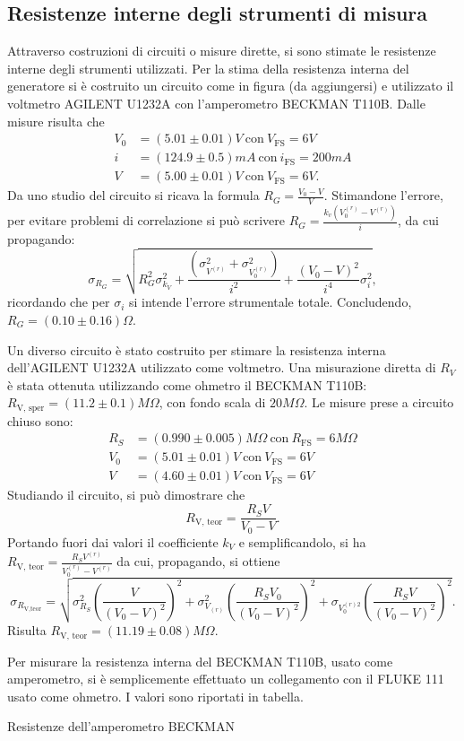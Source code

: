 \subsection{Resistenze interne degli strumenti di misura}
Attraverso costruzioni di circuiti o misure dirette, si sono stimate le resistenze interne degli strumenti utilizzati.
Per la stima della resistenza interna del generatore si \`e costruito un circuito come in figura (da aggiungersi) e utilizzato il voltmetro AGILENT U1232A con l'amperometro BECKMAN T110B.
Dalle misure risulta che
\begin{align}
V_0 &=(5.01 \pm 0.01 )V \ \textrm{con}\  V_{\textrm{FS}}=6V \\
i   &=(124.9 \pm 0.5) mA \ \textrm{con}\  i_{\textrm{FS}}=200mA \\
V   &=(5.00 \pm 0.01) V \ \textrm{con}\  V_{\textrm{FS}}=6V.
\end{align}
Da uno studio del circuito si ricava la formula $R_G=\frac{V_0-V}{V}$.
Stimandone l'errore, per evitare problemi di correlazione si pu\`o scrivere $R_G=\frac{k_v (V_0^{(r)}- V^{(r)})}{i}$, da cui propagando: 
\[\sigma_{R_G}=\sqrt{R_G^2 \sigma_{k_V}^2 + \frac{(\sigma_{V^{(r)}}^2 + \sigma_{V_0^{(r)}}^2)}{i^2} + \frac{(V_0-V)^2}{i^4} \sigma_i^2},\] ricordando che per $\sigma_i$ si intende l'errore strumentale totale. Concludendo, $R_G= (0.10 \pm 0.16) \Omega$.

Un diverso circuito \`e stato costruito per stimare la resistenza interna dell'AGILENT U1232A utilizzato come voltmetro.
Una misurazione diretta di $R_V$ \`e stata ottenuta utilizzando come ohmetro il BECKMAN T110B: $R_{\textrm{V, sper}}=(11.2 \pm 0.1) M\Omega$, con fondo scala di $20 M\Omega$. 
Le misure prese a circuito chiuso sono: 
\begin{align}
R_S &= (0.990 \pm 0.005) M\Omega \ \textrm{con}\  R_{\textrm{FS}}=6 M\Omega \\
V_0 &= (5.01 \pm 0.01) V \ \textrm{con}\  V_{\textrm{FS}} = 6 V \\
V &= (4.60 \pm 0.01) V \ \textrm{con}\  V_{\textrm{FS}} = 6 V
\end{align}
Studiando il circuito, si pu\`o dimostrare che 
\[ R_{\textrm{V, teor}} = \frac{R_S V}{V_0 - V} . \]
Portando fuori dai valori il coefficiente $k_V$ e semplificandolo, si ha $R_{\textrm{V, teor}} = \frac{R_S V^{(r)}}{V_0^{(r)} - V^{(r)}}$ da cui, propagando, si ottiene \[\sigma_{R_{\textrm{V,teor}}} = \sqrt{\sigma_{R_S}^2 \left(\frac{V}{(V_0 - V)^2} \right)^2 + \sigma_{V_{(r)}}^2 \left(\frac{R_S V_0}{(V_0 - V)^2}\right)^2 + \sigma_{V_0^{(r) 2}} \left(\frac{R_S V}{(V_0 - V)^2}\right)^2}.\]
Risulta $R_{\textrm{V, teor}} = (11.19 \pm 0.08) M\Omega$.


Per misurare la resistenza interna del BECKMAN T110B, usato come amperometro, si \`e semplicemente effettuato un collegamento con il FLUKE 111 usato come ohmetro. I valori sono riportati in tabella.

\begin{tabella}
	\centering
	
	\caption{Resistenze dell'amperometro BECKMAN}
	\label{tab:03_tab_1.tex}
\end{tabella}

